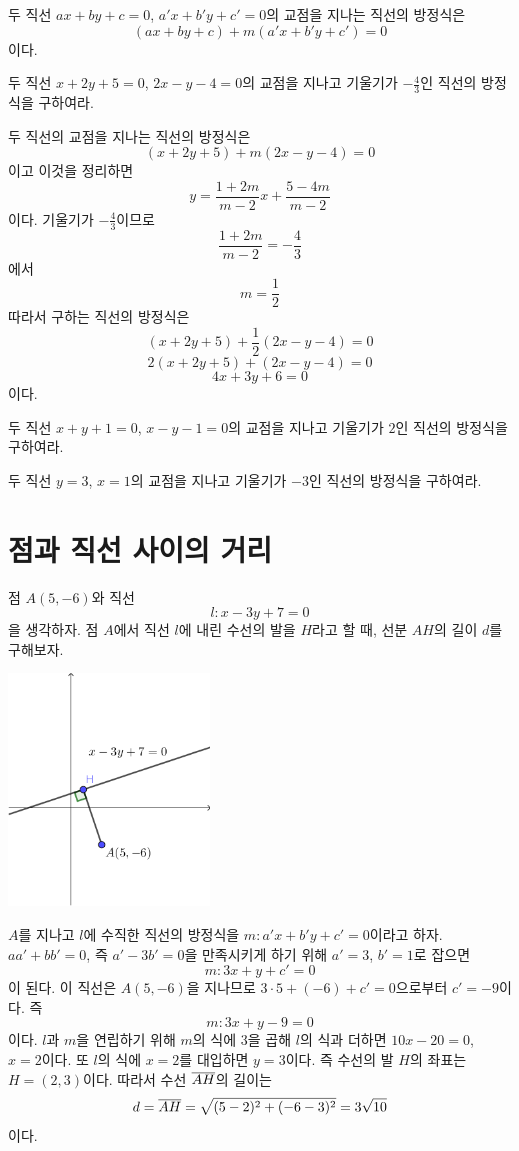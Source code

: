 \documentclass{oblivoir}
\begin{document}
\begin{mdframed}
\theo{}\label{inter2}
두 직선 \(ax+by+c=0\), \(a'x+b'y+c'=0\)의 교점을 지나는 직선의 방정식은
\[(ax+by+c)+m(a'x+b'y+c')=0\]
이다.
\end{mdframed}

\clearpage
\exam{}\label{inter3}
두 직선 \(x+2y+5=0\), \(2x-y-4=0\)의 교점을 지나고 기울기가 \(-\frac43\)인 직선의 방정식을 구하여라.

\begin{mdframed}
두 직선의 교점을 지나는 직선의 방정식은
\[(x+2y+5)+m(2x-y-4)=0\]
이고 이것을 정리하면
\[y=\frac{1+2m}{m-2}x+\frac{5-4m}{m-2}\]
이다.
기울기가 \(-\frac43\)이므로
\[\frac{1+2m}{m-2}=-\frac43\]
에서
\[m=\frac12\]
따라서 구하는 직선의 방정식은
\[(x+2y+5)+\frac12(2x-y-4)=0\]
\[2(x+2y+5)+(2x-y-4)=0\]
\[4x+3y+6=0\]
이다.
\end{mdframed}

\prob{}\label{inter4}
두 직선 \(x+y+1=0\), \(x-y-1=0\)의 교점을 지나고 기울기가 \(2\)인 직선의 방정식을 구하여라.

\prob{}\label{inter5}
두 직선 \(y=3\), \(x=1\)의 교점을 지나고 기울기가 \(-3\)인 직선의 방정식을 구하여라.

\section{점과 직선 사이의 거리}
\exam{}\label{dist1}
점 \(A(5,-6)\)와 직선
\[l:x-3y+7=0\]
을 생각하자.
점 \(A\)에서 직선 \(l\)에 내린 수선의 발을 \(H\)라고 할 때, 선분 \(AH\)의 길이 \(d\)를 구해보자.

\begin{center}
\includegraphics[width=0.4\textwidth]{distance_1}
\end{center}

\(A\)를 지나고 \(l\)에 수직한 직선의 방정식을 \(m:a'x+b'y+c'=0\)이라고 하자.
\(aa'+bb'=0\), 즉 \(a'-3b'=0\)을 만족시키게 하기 위해 \(a'=3\), \(b'=1\)로 잡으면
\[m:3x+y+c'=0\]
이 된다.
이 직선은 \(A(5,-6)\)을 지나므로 \(3\cdot5+(-6)+c'=0\)으로부터 \(c'=-9\)이다.
즉
\[m:3x+y-9=0\]
이다.
\(l\)과 \(m\)을 연립하기 위해 \(m\)의 식에 3을 곱해 \(l\)의 식과 더하면 \(10x-20=0\), \(x=2\)이다.
또 \(l\)의 식에 \(x=2\)를 대입하면 \(y=3\)이다.
즉 수선의 발 \(H\)의 좌표는 \(H=(2,3)\)이다.
따라서 수선 \(\overline{AH}\)의 길이는
\[d=\overline{AH}=\sqrt{(5-2)^2+(-6-3)^2}=3\sqrt{10}\]
이다.
\end{document}
